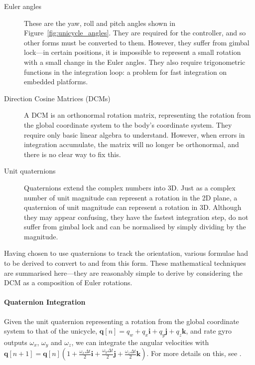 \documentclass{IIBproject}
\begin{document}
\begin{description}
  \item[Euler angles]
    These are the yaw, roll and pitch angles shown in
    Figure~\ref{fig:unicycle_angles}. They are required for the controller,
    and so other forms must be converted to them. However, they suffer from
    gimbal lock---in certain positions, it is impossible to represent a
    small rotation with a small change in the Euler angles. They also require
    trigonometric functions in the integration loop: a problem for fast
    integration on embedded platforms.

  \item[Direction Cosine Matrices (DCMs)]
    A DCM is an orthonormal rotation matrix, representing the rotation from
    the global coordinate system to the body's coordinate system. They require
    only basic linear algebra to understand. However, when errors in
    integration accumulate, the matrix will no longer be orthonormal, and
    there is no clear way to fix this.

  \item[Unit quaternions]
    Quaternions extend the complex numbers into 3D. Just as a complex number
    of unit magnitude can represent a rotation in the 2D plane, a quaternion
    of unit magnitude can represent a rotation in 3D. Although they may appear
    confusing, they have the fastest integration step, do not suffer from
    gimbal lock and can be normalised by simply dividing by the magnitude.

    \end{description}

Having chosen to use quaternions to track the orientation, various formulae
had to be derived to convert to and from this form. These mathematical
techniques are summarised here---they are reasonably simple to derive by
considering the DCM as a composition of Euler rotations.

\paragraph{Quaternion Integration}
Given the unit quaternion representing a rotation from the global coordinate
system to that of the unicycle, $\boldsymbol{q}[n] = q_w + q_x
\boldsymbol{i} + q_y \boldsymbol{j} + q_z \boldsymbol{k}$, and rate gyro
outputs $\omega_x$, $\omega_y$ and $\omega_z$, we can integrate
the angular velocities with $\boldsymbol{q}[n+1] = \boldsymbol{q}[n] \left(1 +
\frac{\omega_x \Delta t}{2} \boldsymbol{i} + 
\frac{\omega_y \Delta t}{2} \boldsymbol{j} + 
\frac{\omega_z \Delta t}{2} \boldsymbol{k}\right)$. For more details on this,
see \cite{ref:quaternions}.
\end{document}
